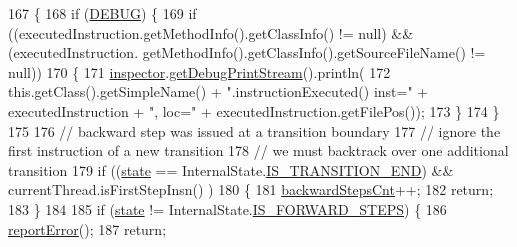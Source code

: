 \begin{DoxyCode}
167                                                                                                            
                            \{
168     \textcolor{keywordflow}{if} (\hyperlink{classgov_1_1nasa_1_1jpf_1_1inspector_1_1server_1_1jpf_1_1_inspector_listener_mode_silent_aace7f1715e5614ddeed907df30ba9949}{DEBUG}) \{
169       \textcolor{keywordflow}{if} ((executedInstruction.getMethodInfo().getClassInfo() != null) && (executedInstruction.
      getMethodInfo().getClassInfo().getSourceFileName() != null))
170       \{
171         \hyperlink{classgov_1_1nasa_1_1jpf_1_1inspector_1_1server_1_1jpf_1_1_inspector_listener_mode_silent_a8b39ccc03189ac6fb2d8d6b58cff969a}{inspector}.\hyperlink{classgov_1_1nasa_1_1jpf_1_1inspector_1_1server_1_1jpf_1_1_j_p_f_inspector_ab936b10b647a6262639d6474fcba6a16}{getDebugPrintStream}().println(
172                 this.getClass().getSimpleName() + \textcolor{stringliteral}{".instructionExecuted() inst="} + executedInstruction + \textcolor{stringliteral}{",
       loc="} + executedInstruction.getFilePos());
173       \}
174     \}
175 
176     \textcolor{comment}{// backward step was issued at a transition boundary}
177     \textcolor{comment}{// ignore the first instruction of a new transition}
178     \textcolor{comment}{// we must backtrack over one additional transition}
179     \textcolor{keywordflow}{if} ((\hyperlink{classgov_1_1nasa_1_1jpf_1_1inspector_1_1server_1_1jpf_1_1_inspector_listener_mode_silent_ae3c50b2d5f0793f31814abb26adbf6e4}{state} == InternalState.\hyperlink{enumgov_1_1nasa_1_1jpf_1_1inspector_1_1server_1_1jpf_1_1_inspector_listener_mode_silent_1_1_internal_state_a90117a0f47367dbacbacfcaa4ee8f49b}{IS\_TRANSITION\_END}) && currentThread.isFirstStepInsn()
      )
180     \{
181       \hyperlink{classgov_1_1nasa_1_1jpf_1_1inspector_1_1server_1_1jpf_1_1_inspector_listener_mode_silent_a70d97ae5dc8e288d8a07700f77a69ba8}{backwardStepsCnt}++;
182       \textcolor{keywordflow}{return};
183     \}
184 
185     \textcolor{keywordflow}{if} (\hyperlink{classgov_1_1nasa_1_1jpf_1_1inspector_1_1server_1_1jpf_1_1_inspector_listener_mode_silent_ae3c50b2d5f0793f31814abb26adbf6e4}{state} != InternalState.\hyperlink{enumgov_1_1nasa_1_1jpf_1_1inspector_1_1server_1_1jpf_1_1_inspector_listener_mode_silent_1_1_internal_state_ac0106956c74f80aa826623b3f58690e8}{IS\_FORWARD\_STEPS}) \{
186       \hyperlink{classgov_1_1nasa_1_1jpf_1_1inspector_1_1server_1_1jpf_1_1_inspector_listener_mode_silent_a8235a8c942226db3fbea54c1ad253468}{reportError}();
187       \textcolor{keywordflow}{return};

\end{DoxyCode}
